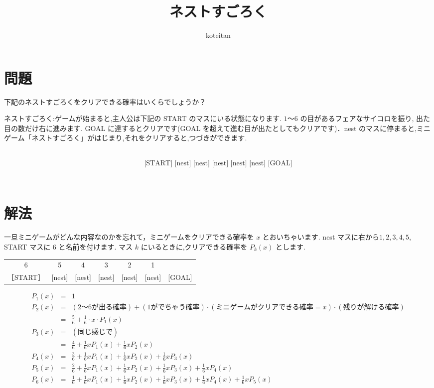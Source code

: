 \documentclass[a4j, 12pt]{jsarticle}
\author{koteitan}
\title{ネストすごろく}
\begin{document}
\maketitle

\section{問題}
\begin{shadebox}
[問] 下記のネストすごろくをクリアできる確率はいくらでしょうか？

\par

ネストすごろく:ゲームが始まると,主人公は下記の START のマスにいる状態になります. $1$～$6$ の目があるフェアなサイコロを振り, 出た目の数だけ右に進みます. GOAL に達するとクリアです(GOAL を超えて進む目が出たとしてもクリアです)．nest のマスに停まると,ミニゲーム「ネストすごろく」がはじまり,それをクリアすると,つづきができます\cite{nestsugoroku}.

~
  \begin{equation*}
    \textrm{[START] [nest] [nest] [nest] [nest] [nest] [GOAL]}
  \end{equation*}

\end{shadebox} 

~

\section{解法}
一旦ミニゲームがどんな内容なのかを忘れて，ミニゲームをクリアできる確率を $x$ とおいちゃいます.
nest マスに右から$1, 2, 3, 4, 5$, START マスに $6$ と名前を付けます.
マス $k$ にいるときに,クリアできる確率を $P_k(x)$ とします.
\begin{table}[h]
  \centering
  \begin{tabular}{ccccccc}
    6 & 5&4&3&2&1&~\\
    ［START］ & [nest]&[nest]&[nest]&[nest]&[nest]&[GOAL]
\end{tabular}
\end{table}

\begin{eqnarray}
  P_1(x)&=&1\\
  P_2(x)&=&(\textrm{2～6が出る確率})+(\textrm{1がでちゃう確率})\cdot(\textrm{ミニゲームがクリアできる確率}=x)\cdot(\textrm{残りが解ける確率})\nonumber\\
      &=& \frac{5}{6} + \frac{1}{6}\cdot x \cdot P_1(x)\\
  P_3(x)&=& (\text{同じ感じで})\\
        &=& \frac{4}{6} + \frac{1}{6}xP_1(x) + \frac{1}{6}xP_2(x)\\
  P_4(x)&=& \frac{3}{6} + \frac{1}{6}xP_1(x) + \frac{1}{6}xP_2(x) + \frac{1}{6}xP_3(x)\\
  P_5(x)&=& \frac{2}{6} + \frac{1}{6}xP_1(x) + \frac{1}{6}xP_2(x) + \frac{1}{6}xP_3(x) + \frac{1}{6}xP_4(x)\\
  P_6(x)&=& \frac{1}{6} + \frac{1}{6}xP_1(x) + \frac{1}{6}xP_2(x) + \frac{1}{6}xP_3(x) + \frac{1}{6}xP_4(x) + \frac{1}{6}xP_5(x)
\end{eqnarray}
\end{document}
